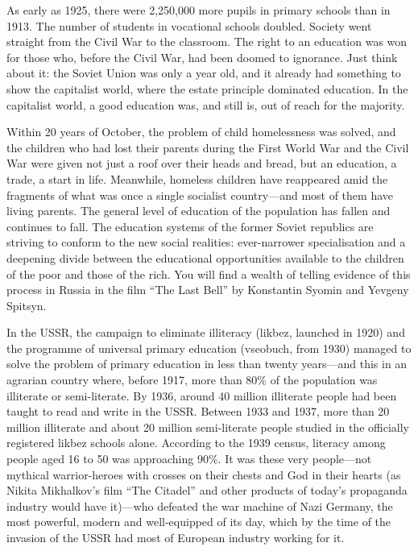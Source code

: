 \documentclass[12pt,a4paper,openany]{book}
\begin{document}
As early as 1925, there were 2,250,000 more pupils in primary schools than in 1913. The number of students in vocational schools doubled. Society went straight from the Civil War to the classroom. The right to an education was won for those who, before the Civil War, had been doomed to ignorance. Just think about it: the Soviet Union was only a year old, and it already had something to show the capitalist world, where the estate principle dominated education. In the capitalist world, a good education was, and still is, out of reach for the majority.

Within 20 years of October, the problem of child homelessness was solved, and the children who had lost their parents during the First World War and the Civil War were given not just a roof over their heads and bread, but an education, a trade, a start in life. Meanwhile, homeless children have reappeared amid the fragments of what was once a single socialist country—and most of them have living parents. The general level of education of the population has fallen and continues to fall. The education systems of the former Soviet republics are striving to conform to the new social realities: ever-narrower specialisation and a deepening divide between the educational opportunities available to the children of the poor and those of the rich. You will find a wealth of telling evidence of this process in Russia in the film “The Last Bell” by Konstantin Syomin and Yevgeny Spitsyn.

In the USSR, the campaign to eliminate illiteracy (likbez, launched in 1920) and the programme of universal primary education (vseobuch, from 1930) managed to solve the problem of primary education in less than twenty years—and this in an agrarian country where, before 1917, more than 80\% of the population was illiterate or semi-literate. By 1936, around 40 million illiterate people had been taught to read and write in the USSR. Between 1933 and 1937, more than 20 million illiterate and about 20 million semi-literate people studied in the officially registered likbez schools alone. According to the 1939 census, literacy among people aged 16 to 50 was approaching 90\%. It was these very people—not mythical warrior-heroes with crosses on their chests and God in their hearts (as Nikita Mikhalkov’s film “The Citadel” and other products of today’s propaganda industry would have it)—who defeated the war machine of Nazi Germany, the most powerful, modern and well-equipped of its day, which by the time of the invasion of the USSR had most of European industry working for it.
\end{document}
